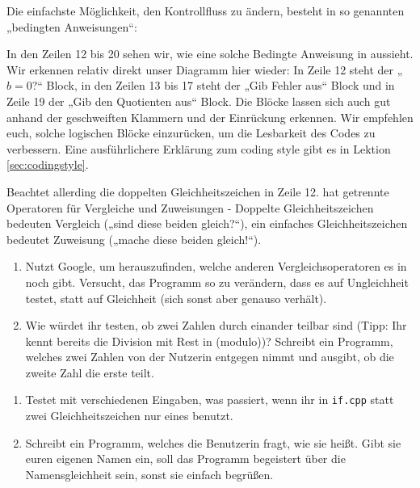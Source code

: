 Die einfachste Möglichkeit, den Kontrollfluss zu ändern, besteht in so
genannten „bedingten Anweisungen“:

In den Zeilen 12 bis 20 sehen wir, wie eine solche Bedingte Anweisung in \Cpp
aussieht. Wir erkennen relativ direkt unser Diagramm hier wieder: In Zeile 12
steht der „$b=0$?“ Block, in den Zeilen 13 bis 17 steht der „Gib Fehler aus“
Block und in Zeile 19 der „Gib den Quotienten aus“ Block. Die Blöcke lassen sich auch gut anhand der geschweiften Klammern und der Einrückung erkennen. Wir empfehlen euch, solche logischen Blöcke einzurücken, um die Lesbarkeit des Codes zu verbessern. Eine ausführlichere Erklärung zum coding style gibt es in Lektion \ref{sec:codingstyle}.

Beachtet allerding die doppelten Gleichheitszeichen in Zeile 12. \Cpp hat
getrennte Operatoren für Vergleiche und Zuweisungen - Doppelte
Gleichheitszeichen bedeuten Vergleich („sind diese beiden gleich?“), ein
einfaches Gleichheitszeichen bedeutet Zuweisung („mache diese beiden gleich!“).

\begin{praxis}
	\begin{enumerate}
		\item Nutzt Google, um herauszufinden, welche anderen Vergleichsoperatoren
		      es in \Cpp noch gibt. Versucht, das Programm so zu verändern, dass es
		      auf Ungleichheit testet, statt auf Gleichheit (sich sonst aber genauso
		      verhält).

		\item Wie würdet ihr testen, ob zwei Zahlen durch einander teilbar sind
		      (Tipp: Ihr kennt bereits die Division mit Rest in \Cpp (modulo))?
		      Schreibt ein Programm, welches zwei Zahlen von der Nutzerin entgegen
		      nimmt und ausgibt, ob die zweite Zahl die erste teilt.
	\end{enumerate}
\end{praxis}

\begin{spiel}
	\begin{enumerate}
		\item Testet mit verschiedenen Eingaben, was passiert, wenn ihr in
		      \texttt{if.cpp} statt zwei Gleichheitszeichen nur eines benutzt.

		\item Schreibt ein Programm, welches die Benutzerin fragt, wie sie heißt.
		      Gibt sie euren eigenen Namen ein, soll das Programm begeistert über die
		      Namensgleichheit sein, sonst sie einfach begrüßen.
	\end{enumerate}
\end{spiel}


